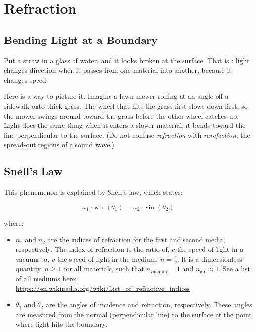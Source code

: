 \section{Refraction}
\subsection{Bending Light at a Boundary}

Put a straw in a glass of water, and it looks broken at
the surface. That is : light changes direction when it
passes from one material into another, because it changes speed.

Here is a way to picture it. Imagine a lawn mower rolling at an angle off a
sidewalk onto thick grass. The wheel that hits the grass first slows down
first, so the mower swings around toward the grass before the other wheel
catches up. Light does the same thing when it enters a slower material:
it bends toward the line perpendicular to the surface. (Do not confuse
\emph{refraction} with \emph{rarefaction}, the spread-out regions of a
sound wave.)

\subsection{Snell's Law}
This phenomenon is explained by Snell's law, which states:

\begin{equation}
n_1 \cdot \sin(\theta_1) = n_2 \cdot \sin(\theta_2)
\end{equation}

where:
\begin{itemize}
\item $n_1$ and $n_2$ are the indices of refraction for the first and second media, respectively. The index of refraction is the ratio of, $c$ the speed of light in a vacuum to, $v$ the speed of light in the medium, $n=\frac{c}{v}$. It is a dimensionless quantity. $n \ge 1$ for all materials, such that $n_{\text{vacuum}} = 1$ and $n_{\text{air}} \approx 1$. See a list of all mediums here: \url{https://en.wikipedia.org/wiki/List_of_refractive_indices}
\item $\theta_1$ and $\theta_2$ are the angles of incidence and refraction, respectively. These angles are measured from the normal (perpendicular line) to the surface at the point where light hits the boundary.
\end{itemize}

